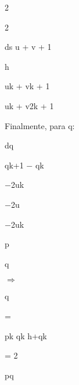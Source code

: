 \documentclass[a4paper,portrait,12pt]{article}
\begin{document}
2


2


\begin{flushleft}
ds u + v + 1
\end{flushleft}


\begin{flushleft}
h
\end{flushleft}


\begin{flushleft}
uk + vk + 1
\end{flushleft}


\begin{flushleft}
uk + v2k + 1
\end{flushleft}


\begin{flushleft}
Finalmente, para q:
\end{flushleft}


\begin{flushleft}
dq
\end{flushleft}


\begin{flushleft}
qk+1 $-$ qk
\end{flushleft}


\begin{flushleft}
$-$2uk
\end{flushleft}


\begin{flushleft}
$-$2u
\end{flushleft}


\begin{flushleft}
$-$2uk
\end{flushleft}


\begin{flushleft}
p
\end{flushleft}


\begin{flushleft}
q
\end{flushleft}


$\Rightarrow$


\begin{flushleft}
q
\end{flushleft}


=


\begin{flushleft}
pk qk h+qk
\end{flushleft}


= 2


\begin{flushleft}
pq
\end{flushleft}
\end{document}
